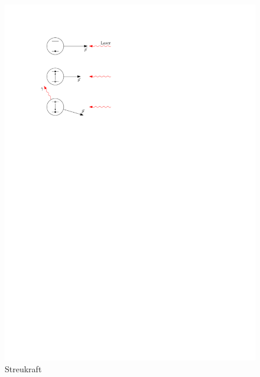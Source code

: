 \documentclass[11pt, a4paper]{article}
\numberwithin{equation}{section}
\begin{document}
\begin{figure}
	\centering
	\includegraphics{./figures/theory/streukraft.pdf}
	\caption{Streukraft}
\end{figure}
\end{document}
